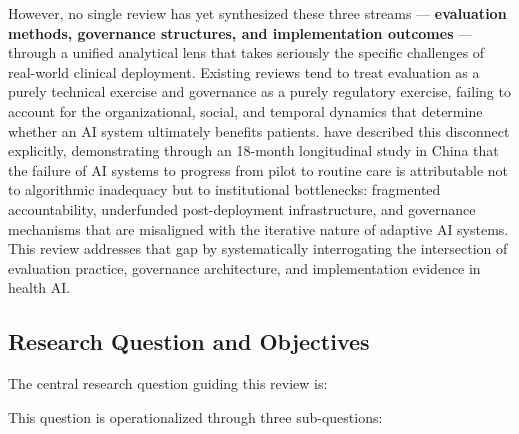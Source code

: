 However, no single review has yet synthesized these three streams --- \textbf{evaluation methods, governance structures, and implementation outcomes} --- through a unified analytical lens that takes seriously the specific challenges of real-world clinical deployment. Existing reviews tend to treat evaluation as a purely technical exercise and governance as a purely regulatory exercise, failing to account for the organizational, social, and temporal dynamics that determine whether an AI system ultimately benefits patients. \citet{tian2026pilottrap} have described this disconnect explicitly, demonstrating through an 18-month longitudinal study in China that the failure of AI systems to progress from pilot to routine care is attributable not to algorithmic inadequacy but to institutional bottlenecks: fragmented accountability, underfunded post-deployment infrastructure, and governance mechanisms that are misaligned with the iterative nature of adaptive AI systems. This review addresses that gap by systematically interrogating the intersection of evaluation practice, governance architecture, and implementation evidence in health AI.


\subsection{Research Question and Objectives}
\label{sec:research_question}

The central research question guiding this review is:

\begin{center}
\end{center}

This question is operationalized through three sub-questions:

